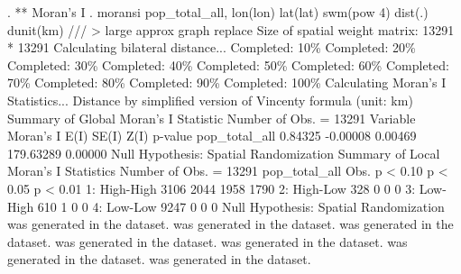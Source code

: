 . ** Moran's I
. moransi pop_total_all, lon(lon) lat(lat) swm(pow 4) dist(.) dunit(km) ///
>         large approx graph replace
{\smallskip}
Size of spatial weight matrix: 13291 * 13291
Calculating bilateral distance...
{\TOPT}
{\VBAR}Completed:  10\%{\VBAR}
{\VBAR}Completed:  20\%{\VBAR}
{\VBAR}Completed:  30\%{\VBAR}
{\VBAR}Completed:  40\%{\VBAR}
{\VBAR}Completed:  50\%{\VBAR}
{\VBAR}Completed:  60\%{\VBAR}
{\VBAR}Completed:  70\%{\VBAR}
{\VBAR}Completed:  80\%{\VBAR}
{\VBAR}Completed:  90\%{\VBAR}
{\VBAR}Completed: 100\%{\VBAR}
{\BOTT}
Calculating Moran's I Statistics...
{\smallskip}
Distance by simplified version of Vincenty formula (unit: km)
{\smallskip}
Summary of Global Moran's I Statistic                      Number of Obs. =     13291
            Variable {\VBAR}  Moran's I         E(I)        SE(I)         Z(I)      p-value
       pop_total_all {\VBAR}    0.84325     -0.00008      0.00469    179.63289      0.00000
Null Hypothesis: Spatial Randomization
{\smallskip}
{\smallskip}
Summary of Local Moran's I Statistics                      Number of Obs. =     13291
       pop_total_all {\VBAR}           Obs.        p < 0.10        p < 0.05        p < 0.01
        1: High-High {\VBAR}           3106            2044            1958            1790
        2: High-Low  {\VBAR}            328               0               0               0
        3: Low-High  {\VBAR}            610               1               0               0
        4: Low-Low   {\VBAR}           9247               0               0               0
Null Hypothesis: Spatial Randomization
{\smallskip}
{} was generated in the dataset.
{} was generated in the dataset.
{} was generated in the dataset.
{} was generated in the dataset.
{} was generated in the dataset.
{} was generated in the dataset.
{} was generated in the dataset.
